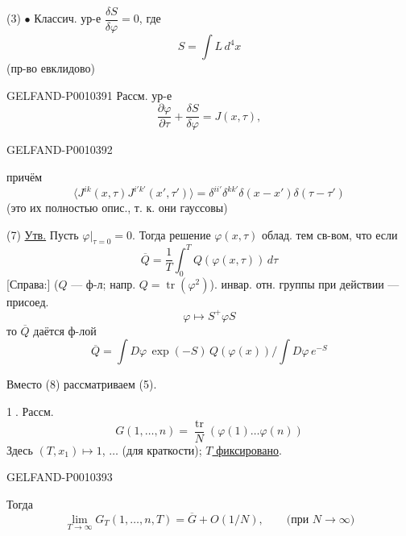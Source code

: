 (3) $\bullet$ Классич. ур-е $\dfrac{\delta S}{\delta\varphi}=0$, где
\begin{equation*}
S=\int L\,d^4x
\tag{4}
\end{equation*}
(пр-во евклидово)


\begin{GelfandAdjacentEvidence}{GELFAND-P001039}{1}
Рассм. ур-е
\begin{equation*}
\frac{\partial\varphi}{\partial\tau}+\frac{\delta S}{\delta\varphi}=J(x,\tau),
\tag{5}
\end{equation*}
\end{GelfandAdjacentEvidence}
\begin{GelfandAdjacentEvidence}{GELFAND-P001039}{2}


причём
\begin{equation*}
\langle J^{ik}(x,\tau)J^{i'k'}(x',\tau')\rangle
=\delta^{ii'}\delta^{kk'}\delta(x-x')\delta(\tau-\tau')
\tag{6}
\end{equation*}
(это их полностью опис., т. к. они гауссовы)

(7) \underline{Утв.} Пусть $\varphi|_{\tau=0}=0$.
Тогда решение $\varphi(x,\tau)$ облад. тем св-вом, что если
\[
\overline Q=\frac1T\int_0^T Q(\varphi(x,\tau))\,d\tau
\]
[Справа:] ($Q$ --- ф-л; напр. $Q=\operatorname{tr}(\varphi^2)$).
инвар. отн. группы при действии --- присоед.
\[
\varphi\longmapsto S^{+}\varphi S
\]
то $\overline Q$ даётся ф-лой
\begin{equation*}
\overline Q=\int D\varphi\,\exp(-S)\,Q(\varphi(x))\Big/\int D\varphi\,e^{-S}
\tag{8}
\end{equation*}

Вместо (8) рассматриваем (5).

\textcircled{1}\quad {}. Рассм.
\begin{equation*}
G(1,\ldots,n)=\frac{\operatorname{tr}}N(\varphi(1)\ldots\varphi(n))
\tag{9}
\end{equation*}
Здесь $(T,x_1)\mapsto1$, $\ldots$ (для краткости);
\underline{$T$ фиксировано}.
\end{GelfandAdjacentEvidence}
\begin{GelfandAdjacentEvidence}{GELFAND-P001039}{3}


Тогда
\begin{equation*}
\lim_{T\to\infty}G_T(1,\ldots,n,T)=\overline G+O(1/N),
\qquad\text{(при }N\to\infty\text{)}
\tag{10}
\end{equation*}
\end{GelfandAdjacentEvidence}
